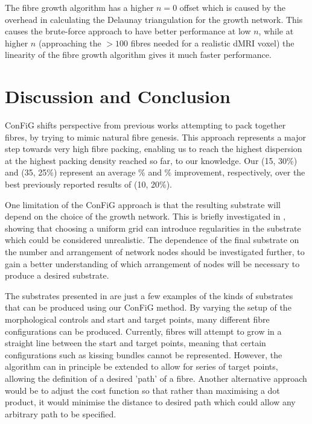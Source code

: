 The fibre growth algorithm has a higher $n=0$ offset which is caused by the overhead in calculating the Delaunay triangulation for the growth network.
This causes the brute-force approach to have better performance at low $n$, while at higher $n$ (approaching the $>100$ fibres needed for a realistic dMRI voxel) the linearity of the fibre growth algorithm gives it much faster performance. 



\section{Discussion and Conclusion}
\label{sec:config_discussion}
ConFiG shifts perspective from previous works attempting to pack together fibres, by trying to mimic natural fibre genesis. 
This approach represents a major step towards very high fibre packing, enabling us to reach the highest dispersion at the highest packing density reached so far, to our knowledge. Our (15\degree, 30\%) and (35\degree, 25\%) represent an average \% and \% improvement, respectively, over the best previously reported results of (10\degree, 20\%)\cite{Ginsburger2018}.

One limitation of the ConFiG approach is that the resulting substrate will depend on the choice of the growth network.
This is briefly investigated in , showing that choosing a uniform grid can introduce regularities in the substrate which could be considered unrealistic.
The dependence of the final substrate on the number and arrangement of network nodes should be investigated further, to gain a better understanding of which arrangement of nodes will be necessary to produce a desired substrate. 


The substrates presented in  are just a few examples of the kinds of substrates that can be produced using our ConFiG method.
By varying the setup of the morphological controls and start and target points, many different fibre configurations can be produced.
Currently, fibres will attempt to grow in a straight line between the start and target points, meaning that certain configurations such as kissing bundles cannot be represented.
However, the algorithm can in principle be extended to allow for series of target points, allowing the definition of a desired 'path' of a fibre.
Another alternative approach would be to adjust the cost function so that rather than maximising a dot product, it would minimise the distance to desired path which could allow any arbitrary path to be specified.


